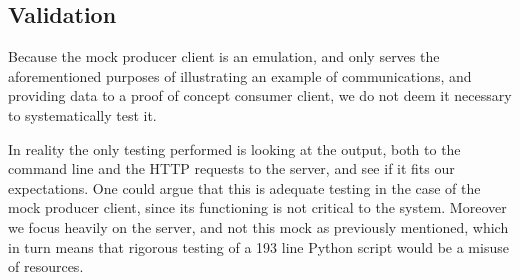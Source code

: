 \subsection{Validation}
Because the mock producer client is an emulation, and only serves the aforementioned purposes of illustrating an example of communications, and providing data to a proof of concept consumer client,
we do not deem it necessary to systematically test it.

In reality the only testing performed is looking at the output, both to the command line and the HTTP requests to the server, and see if it fits our expectations.
One could argue that this is adequate testing in the case of the mock producer client, since its functioning is not critical to the system.
Moreover we focus heavily on the server, and not this mock as previously mentioned, which in turn means that rigorous testing of a 193 line Python script would be a misuse of resources.
